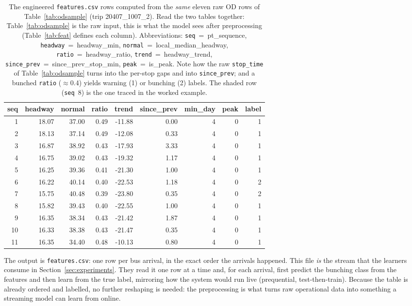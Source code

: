 \documentclass[final,5p,times,twocolumn,authoryear]{elsarticle}
\begin{document}
\begin{table}[t]
\centering
\setlength{\tabcolsep}{4pt}
\scriptsize
\caption{The engineered \texttt{features.csv} rows computed from the \emph{same} eleven raw OD rows
of Table~\ref{tab:odsample} (trip 20407\_1007\_2). Read the two tables together:
Table~\ref{tab:odsample} is the raw input, this is what the model sees after preprocessing
(Table~\ref{tab:feat} defines each column). Abbreviations: \texttt{seq}~=~pt\_sequence,
\texttt{headway}~=~headway\_min, \texttt{normal}~=~local\_median\_headway,
\texttt{ratio}~=~headway\_ratio, \texttt{trend}~=~headway\_trend,
\texttt{since\_prev}~=~since\_prev\_stop\_min,
\texttt{peak}~=~is\_peak. Note how the raw \texttt{stop\_time}
of Table~\ref{tab:odsample} turns into the per-stop gaps and into
\texttt{since\_prev}; and a bunched
\texttt{ratio} ($\approx$0.4) yields warning (1) or bunching (2) labels. The shaded row
(\texttt{seq}~8) is the one traced in the worked example.}
\label{tab:featsample}
\begin{tabular}{rrrrrrrrr}
\toprule
seq & headway & normal & ratio & trend & since\_prev & min\_day & peak & label \\
\midrule
1  & 18.07 & 37.00 & 0.49 & -11.88 & 0.00 & 4 & 0 & 1 \\
2  & 18.13 & 37.14 & 0.49 & -12.08 & 0.33 & 4 & 0 & 1 \\
3  & 16.87 & 38.92 & 0.43 & -17.93 & 3.33 & 4 & 0 & 1 \\
4  & 16.75 & 39.02 & 0.43 & -19.32 & 1.17 & 4 & 0 & 1 \\
5  & 16.25 & 39.36 & 0.41 & -21.30 & 1.00 & 4 & 0 & 1 \\
6  & 16.22 & 40.14 & 0.40 & -22.53 & 1.18 & 4 & 0 & 2 \\
7  & 15.75 & 40.48 & 0.39 & -23.80 & 0.35 & 4 & 0 & 2 \\
\rowcolor{gray!15} 8  & 15.82 & 39.43 & 0.40 & -22.55 & 1.00 & 4 & 0 & 1 \\
9  & 16.35 & 38.34 & 0.43 & -21.42 & 1.87 & 4 & 0 & 1 \\
10 & 16.33 & 38.38 & 0.43 & -21.47 & 0.35 & 4 & 0 & 1 \\
11 & 16.35 & 34.40 & 0.48 & -10.13 & 0.80 & 4 & 0 & 1 \\
\bottomrule
\end{tabular}
\end{table}

The output is \texttt{features.csv}: one row per bus arrival, in the exact order the arrivals
happened. This file \emph{is} the stream that the learners consume in Section~\ref{sec:experiments}.
They read it one row at a time and, for each arrival, first predict the bunching class from the
features and then learn from the true label, mirroring how the system would run live (prequential,
test-then-train). Because the table is already ordered and labelled, no further reshaping is needed:
the preprocessing is what turns raw operational data into something a streaming model can learn from
online.
\end{document}
